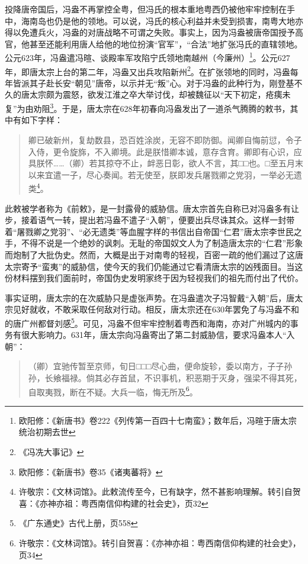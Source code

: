 投降唐帝国后，冯盎不再掌控全粤，但冯氏的根本重地粤西仍被他牢牢控制在手中，海南岛也仍是他的领地。可以说，冯氏的核心利益并未受到损害，南粤大地亦得以免遭兵火，冯盎的对唐战略不可谓之失败。事实上，因为冯盎被唐帝国授予高官，他甚至还能利用唐人给他的地位扮演“官军”，“合法”地扩张冯氏的直辖领地。公元623年，冯盎遣冯暄、谈殿率军攻陷宁氏领地南越州（今廉州）\footnote{欧阳修：《新唐书》卷222《列传第一百四十七南蛮》；数年后，冯暄于唐太宗统治初期去世}。公元627年，即唐太宗上台的第二年，冯盎又出兵攻陷新州\footnote{《冯冼大事记》}。在扩张领地的同时，冯盎每年皆派其子赴长安“朝见”唐帝，以示并无“叛”心。对于冯盎的此种行为，刚登基不久的唐太宗颇为震怒，欲发江淮之卒大举讨伐，却被魏征以“天下初定，疮痍未复”为由劝阻\footnote{欧阳修：《新唐书》卷35《诸夷蕃将》}。于是，唐太宗在628年初春向冯盎发出了一道杀气腾腾的敕书，其中有如下字样：

\begin{quote}
	卿已破新州，复劫数县，恐百姓涂炭，无容不即防御。闻卿自悔前愆，令子入侍，更令旋旆，不入卿境。此是朕惜卿本诚，意存含育。卿即有心识，应具朕怀……（卿）若其掠夺不止，衅恶日彰，欲人不言，其□□也。□至五月末以来宜遣一子，尽心奏闻。若无使至，朕即发兵屠戮卿之党羽，一举必无遗类\footnote{许敬宗：《文林词馆》。此敕流传至今，已有缺字，然不甚影响理解。转引自贺喜：《亦神亦祖：粤西南信仰构建的社会史》，页32}。
\end{quote}


此敕被学者称为《前敕》，是一封露骨的威胁信。唐太宗首先自称已对冯盎多有让步，接着语气一转，提出若冯盎不遣子“入朝”，便要出兵尽诛其众。这样一封带着“屠戮卿之党羽”、“必无遗类”等血腥字样的书信出自帝国“仁君”唐太宗李世民之手，不得不说是一个绝妙的讽刺。无耻的帝国奴文人为了制造唐太宗的“仁君”形象而炮制了大批伪史。然而，大概是出于对南粤的轻视，百密一疏的他们漏过了这唐太宗寄予“蛮夷”的威胁信，使今天的我们仍能通过它看清唐太宗的凶残面目。当这份材料摆到我们面前时，帝国伪史发明家终于因为轻视我们的祖先而付出了代价。

事实证明，唐太宗的在次威胁只是虚张声势。在冯盎遣次子冯智戴“入朝”后，唐太宗见好就收，不敢采取任何敌对行动。相反，唐太宗还在630年罢免了与冯盎不和的唐广州都督刘感\footnote{《广东通史》古代上册，页558}。可见，冯盎不但牢牢控制着粤西和海南，亦对广州城内的事务有很大影响力。631年，唐太宗向冯盎寄出了第二封威胁信，要求冯盎本人“入朝”：


\begin{quote}
	（卿）宜驰传暂至京师，旬日□□□尽心曲，便命旋轸，委以南方，子子孙孙，长飨福禄。倘其必存首鼠，不识事机，积恶期于灭身，强梁不得其死，自取夷戮，断在不疑。大兵一临，悔无所及\footnote{许敬宗：《文林词馆》。转引自贺喜：《亦神亦祖：粤西南信仰构建的社会史》，页34}。
\end{quote}


